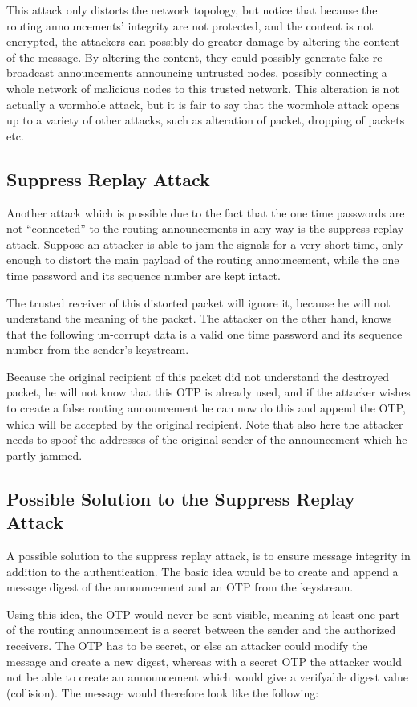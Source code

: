 This attack only distorts the network topology, but notice that because the
routing announcements' integrity are not protected, and the content is not
encrypted, the attackers can possibly do greater damage by altering the content
of the message. By altering the content, they could possibly generate fake
re-broadcast announcements announcing untrusted nodes, possibly connecting a
whole network of malicious nodes to this trusted network. This alteration is
not actually a wormhole attack, but it is fair to say that the wormhole attack
opens up to a variety of other attacks, such as alteration of packet, dropping
of packets etc.

\subsection{Suppress Replay Attack}
Another attack which is possible due to the fact that the one time passwords are
not ``connected'' to the routing announcements in any way is the suppress replay
attack. Suppose an attacker is able to jam the signals for a very short time,
only enough to distort the main payload of the routing announcement, while the
one time password and its sequence number are kept intact.

The trusted receiver of this distorted packet will ignore it, because he will
not understand the meaning of the packet. The attacker on the other hand, knows
that the following un-corrupt data is a valid one time password and its sequence
number from the sender's keystream.

Because the original recipient of this packet did not understand the destroyed
packet, he will not know that this \ac{OTP} is already used, and if the attacker
wishes to create a false routing announcement he can now do this and append the
\ac{OTP}, which will be accepted by the original recipient. Note that also here
the attacker needs to spoof the addresses of the original sender of the
announcement which he partly jammed.

\subsection{Possible Solution to the Suppress Replay Attack}
A possible solution to the suppress replay attack, is to ensure message
integrity in addition to the authentication. The basic idea would be to create
and append a message digest of the announcement and an OTP from the keystream.

Using this idea, the OTP would never be sent visible, meaning at least one part
of the routing announcement is a secret between the sender and the authorized
receivers. The OTP has to be secret, or else an attacker could modify the
message and create a new digest, whereas with a secret OTP the attacker would
not be able to create an announcement which would give a verifyable digest value
(collision). The message would therefore look like the following:

